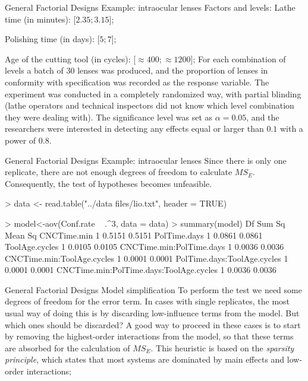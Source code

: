 \documentclass[t]{beamer}
\begin{document}

\begin{ftst}
{General Factorial Designs}
{Example: intraocular lenses}
Factors and levels:
\bitems Lathe time (in minutes): [$2.35; 3.15$];
\item Polishing time (in days): [$5; 7$];
\item Age of the cutting tool (in cycles): [$\approx 400; \approx 1200$];
\eitem
\vhalf
For each combination of levels a batch of 30 lenses was produced, and the proportion of lenses in conformity with specification was recorded  as the response variable.
\vhalf
The experiment was conducted in a completely randomized way, with partial blinding (lathe operators and technical inspectors did not know which level combination they were dealing with). 
\vhalf
The significance level was set as $\alpha=0.05$, and the researchers were interested in detecting any effects equal or larger than $0.1$ with a power of $0.8$.
\end{ftst}


\begin{ftstf}
{General Factorial Designs}
{Example: intraocular lenses}
Since there is only one replicate, there are not enough degrees of freedom to calculate $MS_E$. Consequently, the test of hypotheses becomes unfeasible.

\begin{rcode}
> data <- read.table("../data files/lio.txt", header = TRUE)

> model<-aov(Conf.rate ~ .^3, data = data)
> summary(model)
                                        Df Sum Sq Mean Sq
CNCTime.min                              1 0.5151  0.5151
PolTime.days                             1 0.0861  0.0861
ToolAge.cycles                           1 0.0105  0.0105
CNCTime.min:PolTime.days                 1 0.0036  0.0036
CNCTime.min:ToolAge.cycles               1 0.0001  0.0001
PolTime.days:ToolAge.cycles              1 0.0001  0.0001
CNCTime.min:PolTime.days:ToolAge.cycles  1 0.0036  0.0036
\end{rcode}
\end{ftstf}


\begin{ftst}
{General Factorial Designs}
{Model simplification}
To perform the test we need some degrees of freedom for the error term. In cases with single replicates, the most usual way of doing this is by discarding low-influence terms from the model. But which ones should be discarded?
\vone
A good way to proceed in these cases is to start by removing the highest-order interactions from the model, so that these terms are absorbed for the calculation of $MS_E$. 
\vone
This heuristic is based on the \textit{sparsity principle}, which states that most systems are dominated by main effects and low-order interactions;
\end{ftst}
\end{document}
